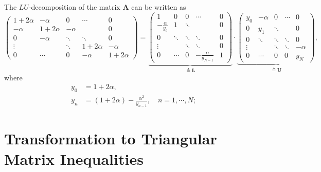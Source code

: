 \documentclass[paper=a4, fontsize=10pt,]{scrartcl} %
\theoremstyle{theorem}
\theoremstyle{remark}
\theoremstyle{example}
\numberwithin{equation}{section} %
\numberwithin{figure}{section} %
\numberwithin{table}{section} %
\begin{document}
The $LU$-decomposition of the matrix $\mathbf{A}$ can be written as
$$
\begin{pmatrix}
1+2\alpha & -\alpha & 0 & \cdots & 0\\
-\alpha & 1+2\alpha & -\alpha &  & 0\\
0 & -\alpha &\ddots & \ddots & 0\\
\vdots & & \ddots & 1+2\alpha & -\alpha\\
0&\cdots & 0 &-\alpha & 1+2\alpha
\end{pmatrix}
= \underbrace{\begin{pmatrix}
1 & 0 & 0 & \cdots & 0\\
-\frac{\alpha}{y_0} & 1 & \ddots &  & 0\\
0 & \ddots &\ddots & \ddots & 0\\
\vdots & & \ddots & \ddots & 0\\
0&\cdots & 0 &-\frac{\alpha}{y_{N-1}} & 1
\end{pmatrix}}_{\triangleq \mathbf{L}}\cdot
\underbrace{\begin{pmatrix}
y_0 & -\alpha & 0 & \cdots & 0\\
0 & y_1 & \ddots &  & 0\\
0 & \ddots &\ddots & \ddots & 0\\
\vdots & & \ddots & \ddots & -\alpha\\
0&\cdots & 0 &0 & y_{N}
\end{pmatrix}}_{\triangleq \mathbf{U}},
$$
where
\begin{align}\label{recursion}
y_0 &= 1+2\alpha,\\
y_n &= (1+2\alpha) -\frac{\alpha^2}{y_{n-1}}, \quad n=1,\cdots,N;
\end{align}

\section{Transformation to Triangular Matrix Inequalities}
\end{document}
